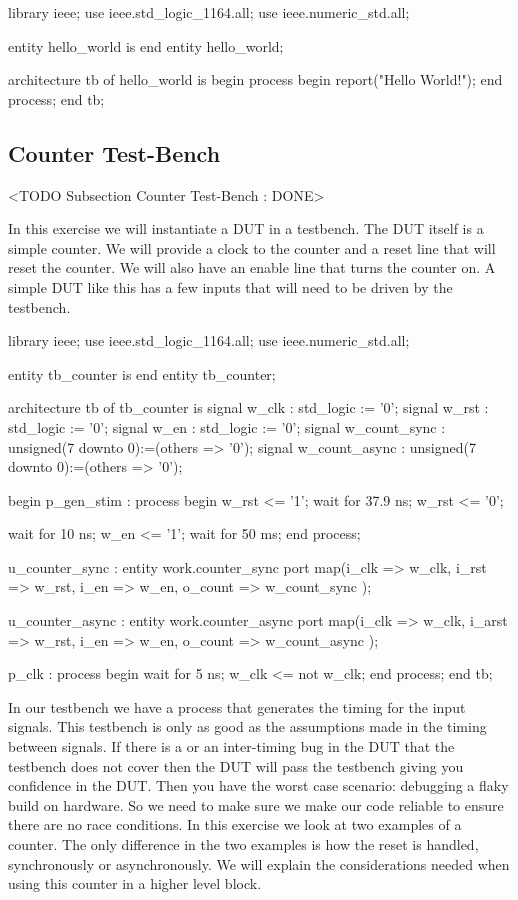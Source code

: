 \begin{VHDLlisting}[tabsize=8]
library ieee;
  use ieee.std_logic_1164.all;
  use ieee.numeric_std.all;
  
entity hello_world is
end entity hello_world;

architecture tb of hello_world is
begin
	process
	begin
		report("Hello World!");
	end process;
end tb;
\end{VHDLlisting}
	
	
\subsection{Counter Test-Bench}
	<TODO Subsection Counter Test-Bench : DONE>

In this exercise we will instantiate a \ac{DUT} in a testbench. The \ac{DUT} itself is a simple counter. We will provide a clock to the counter and a reset line that will reset the counter. We will also have an enable line that turns the counter on. A simple \ac{DUT} like this has a few inputs that will need to be driven by the testbench.      
	
\begin{VHDLlisting}
library ieee;
  use ieee.std_logic_1164.all;
  use ieee.numeric_std.all;
  
entity tb_counter is
end entity tb_counter;

architecture tb of tb_counter is
	signal w_clk         : std_logic := '0';
	signal w_rst         : std_logic := '0';
	signal w_en          : std_logic := '0';
	signal w_count_sync  : unsigned(7 downto 0):=(others => '0');
	signal w_count_async : unsigned(7 downto 0):=(others => '0');

begin
	p_gen_stim : process
	begin
		w_rst <= '1';
		wait for 37.9 ns;
		w_rst <= '0';
		
		wait for 10 ns;
		w_en <= '1';
		wait for 50 ms;	
	end process;
	
	u_counter_sync : entity work.counter_sync
	port map(i_clk    => w_clk,
			 i_rst    => w_rst,
			 i_en     => w_en,
			 o_count  => w_count_sync
	);
	
	u_counter_async : entity work.counter_async
	port map(i_clk    => w_clk,
			 i_arst   => w_rst,
			 i_en     => w_en,
			 o_count  => w_count_async
	);
	
	p_clk : process
	begin
		wait for 5 ns;
		w_clk <= not w_clk;
	end process;
end tb;
\end{VHDLlisting}

In our testbench we have a process that generates the timing for the input signals. This testbench is only as good as the assumptions made in the timing between signals. If there is a  or an inter-timing bug in the \ac{DUT} that the testbench does not cover then the \ac{DUT} will pass the testbench giving you confidence in the \ac{DUT}. Then you have the worst case scenario: debugging a flaky build on hardware. So we need to make sure we make our code reliable to ensure there are no race conditions. In this exercise we look at two examples of a counter. The only difference in the two examples is how the reset is handled, synchronously or asynchronously. We will explain the considerations needed when using this counter in a higher level block.      

